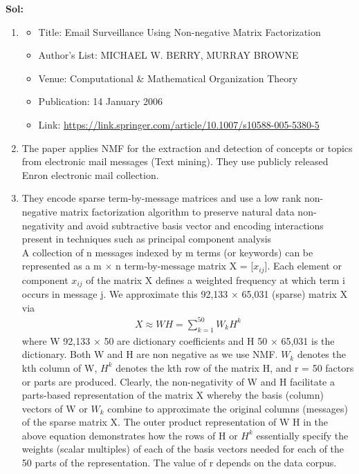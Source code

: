 \documentclass[11pt]{article}
\begin{document}
\begin{enumerate}
\textbf{Sol:} 
\begin{enumerate}

    \item \begin{itemize}
        \item Title: Email Surveillance Using Non-negative Matrix Factorization
        \item Author's List: MICHAEL W. BERRY, MURRAY BROWNE
        \item Venue: Computational \& Mathematical Organization Theory
        \item Publication:  14 January 2006 
        \item Link: \href{https://link.springer.com/article/10.1007/s10588-005-5380-5}{https://link.springer.com/article/10.1007/s10588-005-5380-5}
    \end{itemize}
    \item The paper applies NMF for the extraction and detection of concepts or
topics from electronic mail messages (Text mining). They use publicly released Enron electronic mail collection.
\item They encode sparse
term-by-message matrices and use a low rank non-negative matrix factorization algorithm to preserve natural data
non-negativity and avoid subtractive basis vector and encoding interactions present in techniques such as principal
component analysis\\

A collection of n messages indexed by m terms (or
keywords) can be represented as a m $ \times$ n term-by-message matrix X = [$x_{i j}$]. Each element or component $x_{ij}$ of the matrix X defines a weighted frequency at which term i occurs in message j. We approximate this 92,133 × 65,031 (sparse) matrix X via
\begin{gather*}
    X \approx WH = \sum_{k=1}^{50} W_kH^k
\end{gather*}
where W 92,133 × 50 are dictionary coefficients and H 50 × 65,031 is the dictionary. Both W and H are non negative as we use NMF. $W_k$ denotes the kth column of W, $H^k$ denotes the kth row of the matrix H, and r = 50 factors or parts are produced. Clearly, the non-negativity of W and H facilitate a parts-based representation of the matrix X whereby the basis (column) vectors of W or $W_k$ combine to approximate the original columns (messages) of the sparse matrix X. The outer product representation of W H in the above equation demonstrates how the rows of H or $H^k$ essentially specify the weights (scalar multiples) of each of the basis vectors needed for each of the 50 parts of the representation. The value of r depends on the data corpus.


\end{enumerate}
\end{enumerate}
\end{document}
